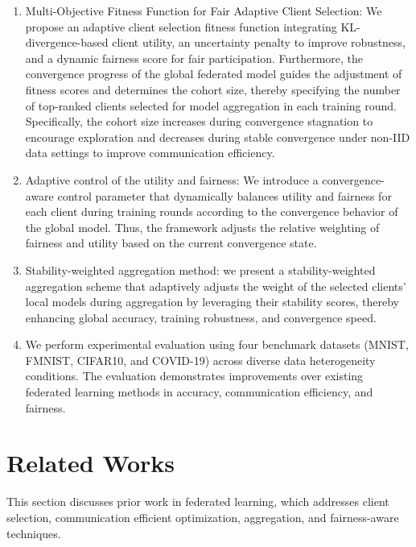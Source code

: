 \documentclass[pdflatex,sn-mathphys-num,oneside]{sn-jnl}%
\theoremstyle{thmstyleone}%
\theoremstyle{thmstyletwo}%
\theoremstyle{thmstylethree}%
\begin{document}
\begin{enumerate}[label=\arabic*-]
\item Multi-Objective Fitness Function for Fair Adaptive Client Selection: We propose an adaptive client selection fitness function integrating KL-divergence-based client utility, an uncertainty penalty to improve robustness, and a dynamic fairness score for fair participation. Furthermore, the convergence progress of the global federated model guides the adjustment of fitness scores and determines the cohort size, thereby specifying the number of top-ranked clients selected for model aggregation in each training round. Specifically, the cohort size increases during convergence stagnation to encourage exploration and decreases during stable convergence under non-IID data settings to improve communication efficiency.

\item Adaptive control of the utility and fairness: We introduce a convergence-aware control parameter that dynamically balances utility and fairness for each client during training rounds according to the convergence behavior of the global model. Thus, the framework adjusts the relative weighting of fairness and utility based on the current convergence state.

\item Stability-weighted aggregation method: we present a stability-weighted aggregation scheme that adaptively adjusts the weight of the selected clients' local models during aggregation by leveraging their stability scores, thereby enhancing global accuracy, training robustness, and convergence speed.

\item We perform experimental evaluation using four benchmark datasets (MNIST, FMNIST, CIFAR10, and COVID-19) across diverse data heterogeneity conditions. The evaluation demonstrates improvements over existing federated learning methods in accuracy, communication efficiency, and fairness.
\end{enumerate}




\section{Related Works}
\label{sec2}

This section discusses prior work in federated learning, which addresses client selection, communication efficient optimization, aggregation, and fairness-aware techniques.
\end{document}
